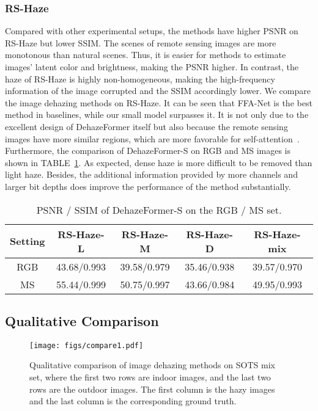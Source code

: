 \documentclass[journal]{IEEEtran}
\begin{document}
\subsubsection{RS-Haze}
Compared with other experimental setups, the methods have higher PSNR on RS-Haze but lower SSIM.
The scenes of remote sensing images are more monotonous than natural scenes. 
Thus, it is easier for methods to estimate images' latent color and brightness, making the PSNR higher.
In contrast, the haze of RS-Haze is highly non-homogeneous, making the high-frequency information of the image corrupted and the SSIM accordingly lower.
We compare the image dehazing methods on RS-Haze. 
It can be seen that FFA-Net is the best method in baselines, while our small model surpasses it.
It is not only due to the excellent design of DehazeFormer itself but also because the remote sensing images have more similar regions, which are more favorable for self-attention~\cite{mei2020pyramid}.
Furthermore, the comparison of DehazeFormer-S on RGB and MS images is shown in TABLE~\ref{tab:ms}.
As expected, dense haze is more difficult to be removed than light haze.
Besides, the additional information provided by more channels and larger bit depths does improve the performance of the method substantially.

\begin{table}[t]
  \centering
  \caption{
    PSNR / SSIM of DehazeFormer-S on the RGB / MS set.
  }
  \label{tab:ms}
  \begin{center}
    \renewcommand\arraystretch{1.25}
      {
      \begin{tabular}{|c|ccc|c|}
        \hline
        Setting & RS-Haze-L & RS-Haze-M  & RS-Haze-D & RS-Haze-mix  \\
        \hline
        \hline
        RGB & 43.68/0.993 & 39.58/0.979 & 35.46/0.938 & 39.57/0.970  \\
        MS & 55.44/0.999 & 50.75/0.997 & 43.66/0.984 & 49.95/0.993  \\
        \hline
      \end{tabular}
      }
  \end{center}
\end{table}

\subsection{Qualitative Comparison}

\begin{figure*}[!t]
  \centering
  \texttt{[image: figs/compare1.pdf]}
  \caption{
    Qualitative comparison of image dehazing methods on SOTS mix set, where the first two rows are indoor images, and the last two rows are the outdoor images.
    The first column is the hazy images and the last column is the corresponding ground truth.
  }
  \label{fig:compare1}
\end{figure*}
\end{document}
